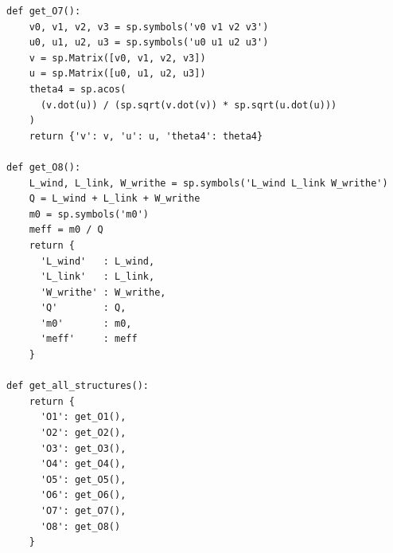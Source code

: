 \begin{lstlisting}[caption={SAT4Dcore\_standalone.py — O1–O8 structure locks}]
def get_O7():
    v0, v1, v2, v3 = sp.symbols('v0 v1 v2 v3')
    u0, u1, u2, u3 = sp.symbols('u0 u1 u2 u3')
    v = sp.Matrix([v0, v1, v2, v3])
    u = sp.Matrix([u0, u1, u2, u3])
    theta4 = sp.acos(
      (v.dot(u)) / (sp.sqrt(v.dot(v)) * sp.sqrt(u.dot(u)))
    )
    return {'v': v, 'u': u, 'theta4': theta4}

def get_O8():
    L_wind, L_link, W_writhe = sp.symbols('L_wind L_link W_writhe')
    Q = L_wind + L_link + W_writhe
    m0 = sp.symbols('m0')
    meff = m0 / Q
    return {
      'L_wind'   : L_wind,
      'L_link'   : L_link,
      'W_writhe' : W_writhe,
      'Q'        : Q,
      'm0'       : m0,
      'meff'     : meff
    }

def get_all_structures():
    return {
      'O1': get_O1(),
      'O2': get_O2(),
      'O3': get_O3(),
      'O4': get_O4(),
      'O5': get_O5(),
      'O6': get_O6(),
      'O7': get_O7(),
      'O8': get_O8()
    }
\end{lstlisting}
